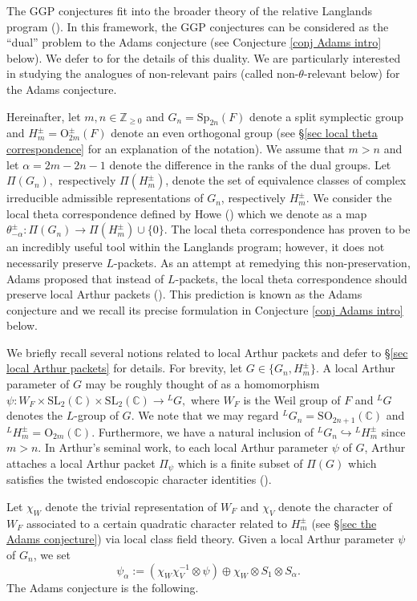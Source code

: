 \documentclass[11pt,letterpaper]{amsart}
\newcommand{\SO}{\mathrm{SO}}
\newcommand{\OO}{\mathrm{O}}
\newcommand{\SL}{\mathrm{SL}}
\newcommand{\Sp}{\mathrm{Sp}}
\newcommand{\BC}{\mathbb{C}}
\numberwithin{equation}{section}
\begin{document}
The GGP conjectures fit into the broader theory of the relative Langlands program (\cite[\S1.5]{BZSV24}). In this framework, the GGP conjectures can be considered as the ``dual'' problem to the Adams conjecture (see Conjecture \ref{conj Adams intro} below). We defer to \cite[Remark 7.12]{GW25} for the details of this duality.
We are particularly interested in studying the analogues of non-relevant pairs (called non-$\theta$-relevant below) for the Adams conjecture.

Hereinafter, let $m,n\in\mathbb{Z}_{\geq 0}$ and $G_n=\Sp_{2n}(F)$ denote a split symplectic group and $H_m^\pm=\OO_{2m}^\pm(F)$ denote an even orthogonal group (see \S\ref{sec local theta correspondence} for an explanation of the notation). We assume that $m>n$ and let $\alpha=2m-2n-1$ denote the difference in the ranks of the dual groups. Let $\Pi(G_n),$ respectively $\Pi(H_m^\pm)$, denote the set of equivalence classes of complex irreducible admissible representations of $G_n$, respectively $H_m^\pm.$
We consider the local theta correspondence defined by Howe (\cite{How79}) which we denote as a map $\theta_{-\alpha}^\pm:\Pi(G_n)\rightarrow\Pi(H_m^\pm)\cup\{0\}$. The local theta correspondence has proven to be an incredibly useful tool within the Langlands program; however, it does not necessarily preserve $L$-packets. As an attempt at remedying this non-preservation, Adams proposed that instead of $L$-packets, the local theta correspondence should preserve local Arthur packets (\cite{Ada89}). This prediction is known as the Adams conjecture and we recall its precise formulation in Conjecture \ref{conj Adams intro} below.

We briefly recall several notions related to local Arthur packets and defer to \S\ref{sec local Arthur packets} for details.
For brevity, let $G\in\{G_n,H_m^\pm\}.$ A local Arthur parameter of $G$ may be roughly thought of as a homomorphism $\psi:W_F\times\SL_2(\BC)\times\SL_2(\BC)\rightarrow{}^LG,$ where $W_F$ is the Weil group of $F$ and ${}^LG$ denotes the $L$-group of $G$. We note that we may regard ${}^LG_n=\SO_{2n+1}(\BC)$ and ${}^L H_m^\pm=\OO_{2m}(\BC).$ Furthermore, we have a natural inclusion of ${}^LG_n\hookrightarrow{}^LH_m^\pm$ since $m>n.$ In Arthur's seminal work, to each local Arthur parameter $\psi$ of $G$, Arthur attaches a local Arthur packet $\Pi_\psi$ which is a finite subset of $\Pi(G)$ which satisfies the twisted endoscopic character identities (\cite[Theorem 1.5.1]{Art13}). 



Let $\chi_W$ denote the trivial representation of $W_F$ and $\chi_V$ denote the character of $W_F$ associated to a certain quadratic character related to $H_m^\pm$ (see \S\ref{sec the Adams conjecture}) via local class field theory. Given a local Arthur parameter $\psi$ of $G_n$, we set
\[
\psi_\alpha:=(\chi_W\chi_V^{-1}\otimes\psi)\oplus \chi_W\otimes S_1\otimes S_\alpha.
\]
The Adams conjecture is the following.
\end{document}
